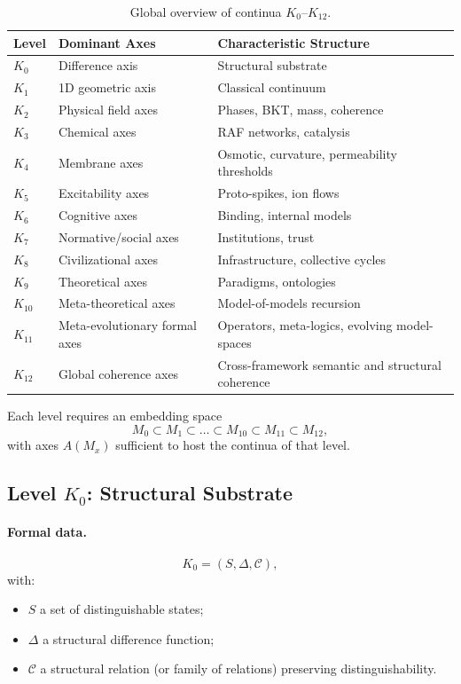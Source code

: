 \begin{table}[h!]
\centering
\begin{tabular}{p{1.8cm} p{3.5cm} p{4.5cm}}
\hline
Level & Dominant Axes & Characteristic Structure \\
\hline
\(K_0\) & Difference axis & Structural substrate \\
\(K_1\) & 1D geometric axis & Classical continuum \\
\(K_2\) & Physical field axes & Phases, BKT, mass, coherence \\
\(K_3\) & Chemical axes & RAF networks, catalysis \\
\(K_4\) & Membrane axes & Osmotic, curvature, permeability thresholds \\
\(K_5\) & Excitability axes & Proto-spikes, ion flows \\
\(K_6\) & Cognitive axes & Binding, internal models \\
\(K_7\) & Normative/social axes & Institutions, trust \\
\(K_8\) & Civilizational axes & Infrastructure, collective cycles \\
\(K_9\) & Theoretical axes & Paradigms, ontologies \\
\(K_{10}\) & Meta-theoretical axes & Model-of-models recursion \\
\(K_{11}\) & Meta-evolutionary formal axes & Operators, meta-logics, evolving model-spaces \\
\(K_{12}\) & Global coherence axes & Cross-framework semantic and structural coherence \\
\hline
\end{tabular}
\caption{Global overview of continua \texorpdfstring{\(K_0\)}{K0}–\(K_{12}\).}
\label{tab:klevels-summary}
\end{table}

Each level requires an embedding space
\[
   M_0 \subset M_1 \subset \dots \subset M_{10} \subset M_{11} \subset M_{12},
\]
with axes \(A(M_x)\) sufficient to host the continua of that level.


\subsection{Level \texorpdfstring{\texorpdfstring{$K_0$}{K\_0}}{K0}: Structural Substrate}

\paragraph{Formal data.}
\[
    K_0 = (S,\Delta,\mathcal{C}),
\]
with:
\begin{itemize}
    \item \(S\) a set of distinguishable states;
    \item \(\Delta\) a structural difference function;
    \item \(\mathcal{C}\) a structural relation (or family of relations)
          preserving distinguishability.
\end{itemize}

